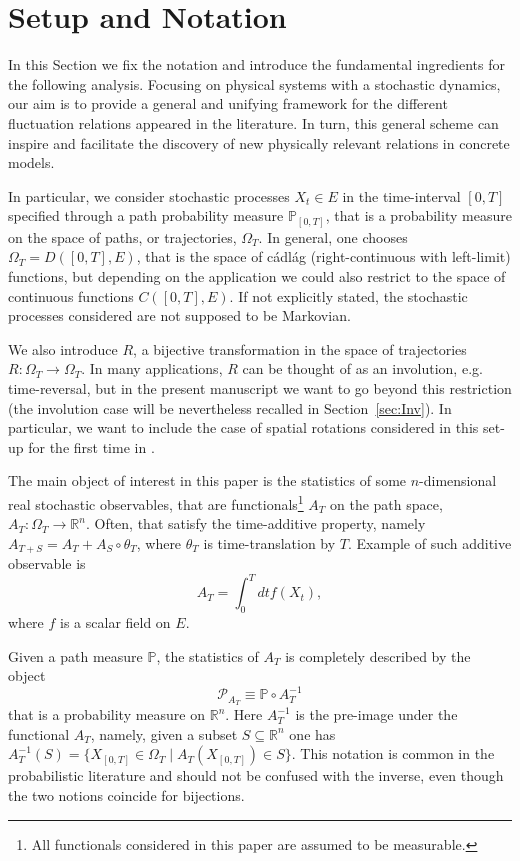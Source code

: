 \documentclass[a4paper,11pt]{article}
\numberwithin{equation}{section}
\begin{document}
\section{Setup and Notation}
\label{sec:setup}

In this Section we fix the notation and introduce the fundamental ingredients for the following analysis. Focusing on physical systems with a stochastic dynamics, our aim is to provide a general and unifying framework for the different fluctuation relations appeared in the literature. In turn, this general scheme can inspire and facilitate the discovery of new physically relevant relations in concrete models.

In particular, we consider stochastic processes $X_t \in E$ in the time-interval $[0,T]$ specified through a path probability measure $\mathbb{P}_{\left[0,T\right]}$, that is a probability measure on the space of paths, or trajectories, $\Omega_T$. In general, one chooses $\Omega_T= D([0,T], E)$, that is the space of c\'adl\'ag (right-continuous with left-limit) functions, but depending on the application we could also restrict to the space of continuous functions $C([0,T], E)$. If not explicitly stated, the stochastic processes considered are not supposed to be Markovian.

We also introduce $R$, a bijective transformation in the space of
trajectories $R : \Omega_T \to \Omega_T$. In many applications, $R$ can be thought of as an involution, e.g. time-reversal, but in the present manuscript we want to go beyond this restriction (the involution case will be nevertheless recalled in Section~\ref{sec:Inv}). In particular, we want to include the case of spatial rotations considered in this set-up for the first time in \cite{Hur+11}.

The main object of interest in this paper is the statistics of some $n$-dimensional real stochastic observables, that are functionals\footnote{All functionals considered in this paper are assumed to be measurable.} $A_T$ on the path space, $A_T: \Omega_T \to \mathbb{R}^n$. Often, that satisfy the time-additive property, namely $A_{T+S}= A_T + A_S \circ \theta_T$, where $\theta_T$ is time-translation by $T$. 
Example of such additive observable is 
\[
A_{T}=\int_{0}^{T}dtf(X_{t}),
\]
where $f$ is a scalar field on $E$. 




Given a path measure $\mathbb{P}$, the statistics of $A_T$ is completely described by the object
\begin{equation}\label{eq:probobs}
    \mathcal{P}_{A_{T}} \equiv \mathbb{P} \circ A_T^{-1} 
\end{equation}
that is a probability measure on $\mathbb{R}^n$. Here $A_T^{-1}$ is the pre-image under the functional $A_T$, namely, given a subset $S \subseteq \mathbb{R}^n$ one has $A_T^{-1}(S) = \{ X_{\left[0,T\right]} \in \Omega_T \; | \; A_T(X_{\left[0,T\right]}) \in S \}$. This notation is common in the probabilistic literature and should not be confused with the inverse, even though the two notions coincide for bijections. 
\end{document}
